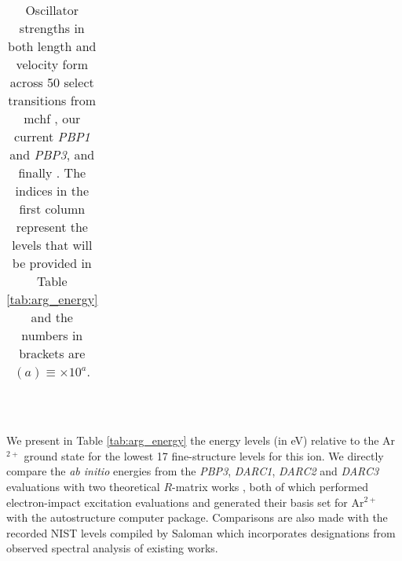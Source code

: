 \begin{table}
\begin{center}
\begin{tabular}{@{} l *8c *2c @{}}
\bottomrule
 \end{tabular}
 \caption{Oscillator strengths in both length and velocity form across 50 select transitions from {\sc mchf} \citep{2006ADNDT..92..607F}, our current \textit{PBP1} and \textit{PBP3}, and finally \citet{2001JQSRT..69..171L}. The indices in the first column represent the levels that will be provided in Table \ref{tab:arg_energy} and the numbers in brackets are $(a) \equiv \times 10^a$. \label{tab:arg_osc}}
 \end{center}
\end{table}
%

~\\
~\\
We present in Table \ref{tab:arg_energy} the energy levels (in eV) relative to the Ar$^{2+}$ ground state for the lowest 17 fine-structure levels for this ion. We directly compare the {\em ab initio} energies from the \textit{PBP3}, \textit{DARC1}, \textit{DARC2} and \textit{DARC3} evaluations with two theoretical $R$-matrix works \citep{2012EPJD...66...84S, 2009A&A...500.1253M}, both of which performed electron-impact excitation evaluations and generated their basis set for Ar$^{2+}$ with the {\sc autostructure} computer package. Comparisons are also made with the recorded NIST levels compiled by Saloman \citep{2010JPCRD..39c3101S} which incorporates designations from observed spectral analysis of existing works. 

